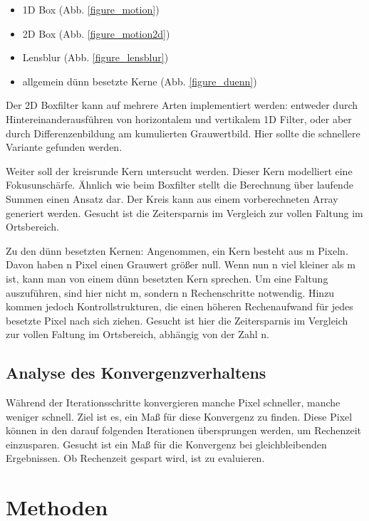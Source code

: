 \documentclass[a4paper,12pt]{article}
\begin{document}
\begin{itemize}
  \itemsep -1pt 
  \item 1D Box (Abb. \ref{figure_motion})
  \item 2D Box (Abb. \ref{figure_motion2d})
  \item Lensblur (Abb. \ref{figure_lensblur})
  \item allgemein dünn besetzte Kerne (Abb. \ref{figure_duenn})
\end{itemize}
Der 2D Boxfilter kann auf mehrere Arten implementiert werden: 
entweder durch Hintereinanderausführen von horizontalem und vertikalem
1D Filter, oder aber durch Differenzenbildung am kumulierten Grauwertbild.
Hier sollte die schnellere Variante gefunden werden.

Weiter soll der kreisrunde Kern untersucht werden. Dieser Kern modelliert eine
Fokusunschärfe. Ähnlich wie beim Boxfilter stellt die Berechnung über laufende
Summen einen Ansatz dar. Der Kreis kann aus einem vorberechneten Array generiert
werden. Gesucht ist die Zeitersparnis im Vergleich zur vollen
Faltung im Ortsbereich.

Zu den dünn besetzten Kernen: Angenommen, ein Kern besteht aus m Pixeln. Davon
haben n Pixel einen Grauwert größer null. Wenn nun n viel kleiner als m ist,
kann man von einem dünn besetzten Kern sprechen. Um eine Faltung auszuführen,
sind hier nicht m, sondern n Rechenschritte notwendig. Hinzu kommen jedoch
Kontrollstrukturen, die einen höheren Rechenaufwand für jedes besetzte Pixel
nach sich ziehen.
Gesucht ist hier die Zeitersparnis im Vergleich zur vollen Faltung im
Ortsbereich, abhängig von der Zahl n.

\subsection{Analyse des Konvergenzverhaltens} \label{chp:ziel2}
Während der Iterationsschritte konvergieren manche Pixel schneller, manche
weniger schnell. Ziel ist es, ein Maß für diese Konvergenz zu finden. Diese Pixel können in den darauf folgenden Iterationen 
übersprungen werden, um Rechenzeit einzusparen.
Gesucht ist ein Maß für die Konvergenz bei gleichbleibenden Ergebnissen.
Ob Rechenzeit gespart wird, ist zu evaluieren.


 
\newpage
 
\section{Methoden}
\end{document}
